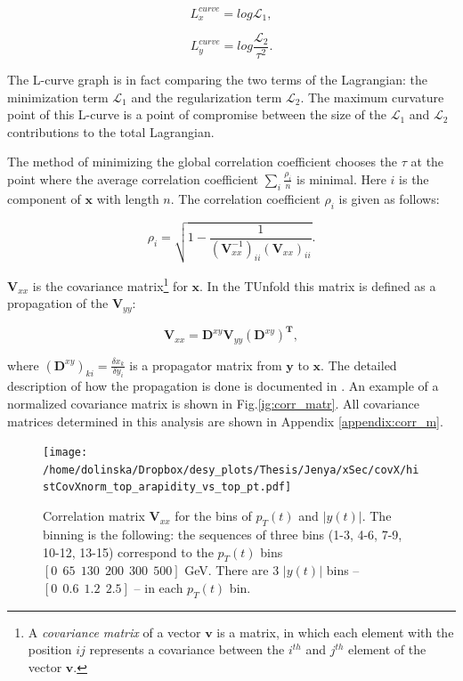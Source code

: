 \begin{equation}
 L_{x}^{curve} = log \mathcal{L}_{1},
\end{equation}

\begin{equation}
 L_{y}^{curve} = log \frac{\mathcal{L}_{2}}{\tau^{2}}.
\end{equation}

The L-curve graph is in fact comparing the two terms of the Lagrangian: the minimization term $\mathcal{L}_{1}$ and the regularization term $\mathcal{L}_2$.
The maximum curvature point of this L-curve is a point of compromise between the size of the $\mathcal{L}_{1}$ and $\mathcal{L}_{2}$ contributions
to the total Lagrangian.

The method of minimizing the global correlation coefficient chooses the $\tau$ at the point where the average correlation coefficient 
$\sum_{i} \frac{\rho_{i}}{n}$ is minimal. Here $i$ is the component of $\mathbf{x}$ with length $n$. The correlation coefficient $\rho_{i}$ is given as follows:

\begin{equation}
 \rho_{i} = \sqrt{1 - \frac{1}{(\mathbf{V}_{xx}^{-1})_{ii} (\mathbf{V}_{xx})_{ii}}}.
\end{equation}

$\mathbf{V}_{xx}$ is the covariance matrix\footnote{A \textit{covariance matrix} of a vector $\mathbf{v}$ is a matrix, in which each element with the position 
$ij$ represents a covariance between the $i^{th}$ and $j^{th}$ element of the vector $\mathbf{v}$.} for $\mathbf{x}$. In the TUnfold this matrix is defined 
as a propagation of the $\mathbf{V}_{yy}$:

\begin{equation}\label{eq:vxx}
 \mathbf{V}_{xx} = \mathbf{D}^{xy}\mathbf{V}_{yy}(\mathbf{D}^{xy})^{\mathbf{T}},
\end{equation}

where $(\mathbf{D}^{xy})_{ki} = \frac{\delta x_{k}}{\delta y_{i}}$ is a propagator matrix from $\mathbf{y}$ to $\mathbf{x}$. The detailed description
of how the propagation is done is documented in \cite{Schmitt:2012kp}. An example of a normalized covariance matrix is shown in Fig.\ref{ig:corr_matr}.
All covariance matrices determined in this analysis are shown in Appendix \ref{appendix:corr_m}.

\begin{figure}[t]
  \centering
  \texttt{[image: /home/dolinska/Dropbox/desy\_plots/Thesis/Jenya/xSec/covX/histCovXnorm\_top\_arapidity\_vs\_top\_pt.pdf]}
  \caption{Correlation matrix $\mathbf{V}_{xx}$ for the bins of $p_{T}(t)$ and $|y(t)|$. The binning is the following:
  the sequences of three bins (1-3, 4-6, 7-9, 10-12, 13-15) correspond to the $p_{T}(t)$ bins $[0\:\:65\:\:130\:\:200\:\:300\:\:500]$ GeV.
          There are 3 $|y(t)|$ bins -- $[0\:\:0.6\:\:1.2\:\:2.5]$ -- in each $p_{T}(t)$ bin.}
  \label{fig:corr_matr}
\end{figure}

